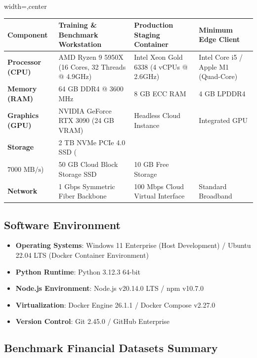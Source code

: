 \documentclass[12pt,a4paper,oneside]{report}
\begin{document}
\begin{table}[H]
\centering
\footnotesize
\begin{adjustbox}{width=\textwidth,center}
\begin{tabular}{| l | l | l | l |}
\hline
\rowcolor{tableheader} \textbf{Component} & \textbf{Training \& Benchmark Workstation} & \textbf{Production Staging Container} & \textbf{Minimum Edge Client} \\ \hline
\textbf{Processor (CPU)} & AMD Ryzen 9 5950X (16 Cores, 32 Threads @ 4.9GHz) & Intel Xeon Gold 6338 (4 vCPUs @ 2.6GHz) & Intel Core i5 / Apple M1 (Quad-Core) \\ \hline
\rowcolor{tablealt} \textbf{Memory (RAM)} & 64 GB DDR4 @ 3600 MHz & 8 GB ECC RAM & 4 GB LPDDR4 \\ \hline
\textbf{Graphics (GPU)} & NVIDIA GeForce RTX 3090 (24 GB VRAM) & Headless Cloud Instance & Integrated GPU \\ \hline
\rowcolor{tablealt} \textbf{Storage} & 2 TB NVMe PCIe 4.0 SSD (\\$7000\text{ MB/s}$) & 50 GB Cloud Block Storage SSD & 10 GB Free Storage \\ \hline
\textbf{Network} & 1 Gbps Symmetric Fiber Backbone & 100 Mbps Cloud Virtual Interface & Standard Broadband \\ \hline
\end{tabular}
\end{adjustbox}
\end{table}

\subsection{Software Environment}

\begin{itemize}[leftmargin=0.35in]
\item \textbf{Operating Systems}: Windows 11 Enterprise (Host Development) / Ubuntu 22.04 LTS (Docker Container Environment)
\item \textbf{Python Runtime}: Python 3.12.3 64-bit
\item \textbf{Node.js Environment}: Node.js v20.14.0 LTS / npm v10.7.0
\item \textbf{Virtualization}: Docker Engine 26.1.1 / Docker Compose v2.27.0
\item \textbf{Version Control}: Git 2.45.0 / GitHub Enterprise
\end{itemize}


\subsection{Benchmark Financial Datasets Summary}
\end{document}
